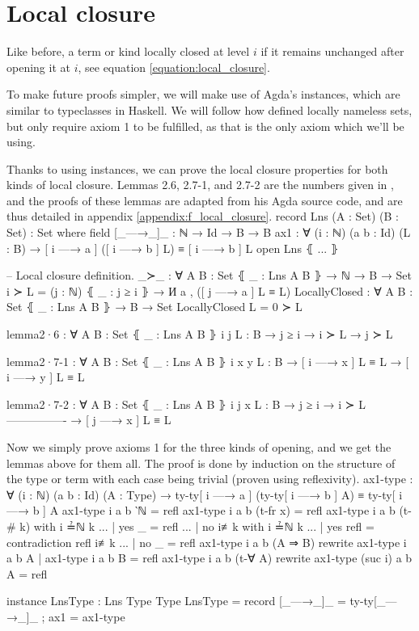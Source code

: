 \documentclass[logo,bsc,singlespacing,parskip,online]{infthesis}
\renewenvironment{code}{\mintedcopy[breaklines,breaksymbolleft=\;]{agda}}{\endmintedcopy}
\begin{document}
\section{Local closure}
\label{chapter4:local_closure}
Like before, a term or kind locally closed at level $i$ if it remains unchanged after opening it at
$i$, see equation \ref{equation:local_closure}.

To make future proofs simpler, we will make use of Agda's instances, which are similar to
typeclasses in Haskell. We will follow how \citet{pitts_locally_2023} defined locally nameless sets,
but only require axiom 1 to be fulfilled, as that is the only axiom which we'll be using.

Thanks to using instances, we can prove the local closure properties for both kinds of local
closure. Lemmas 2.6, 2.7-1, and 2.7-2 are the numbers given in \citet{pitts_locally_2023}, and the
proofs of these lemmas are adapted from his Agda source code, and are thus detailed in appendix \ref{appendix:f_local_closure}.
\begin{code}
  record Lns (A : Set) (B : Set) : Set where
    field
      [_—→_]_ : ℕ → Id → B → B
      ax1 : ∀ (i : ℕ) (a b : Id) (L : B)
        → [ i —→ a ] ([ i —→ b ] L) ≡ [ i —→ b ] L
  open Lns ⦃ ... ⦄

  -- Local closure definition.
  _≻_ : ∀ {A B : Set} ⦃ _ : Lns A B ⦄ → ℕ → B → Set
  i ≻ L = (j : ℕ) ⦃ _ : j ≥ i ⦄ → И a , ([ j —→ a ] L ≡ L)
  LocallyClosed : ∀ {A B : Set} ⦃ _ : Lns A B ⦄ → B → Set
  LocallyClosed L = 0 ≻ L

  lemma2·6 : ∀ {A B : Set} ⦃ _ : Lns A B ⦄ {i j} {L : B}
    → j ≥ i → i ≻ L → j ≻ L

  lemma2·7-1 : ∀ {A B : Set} ⦃ _ : Lns A B ⦄ {i x y} {L : B}
    → [ i —→ x ] L ≡ L → [ i —→ y ] L ≡ L

  lemma2·7-2 : ∀ {A B : Set} ⦃ _ : Lns A B ⦄ {i j x} {L : B}
    → j ≥ i    → i ≻ L
      ----------------
    → [ j —→ x ] L ≡ L
\end{code}

Now we simply prove axioms 1 for the three kinds of opening, and we get the lemmas above for them
all. The proof is done by induction on the structure of the type or term with each case being
trivial (proven using reflexivity).
\begin{code}
  ax1-type : ∀ (i : ℕ) (a b : Id) (A : Type)
    → ty-ty[ i —→ a ] (ty-ty[ i —→ b ] A) ≡ ty-ty[ i —→ b ] A
  ax1-type i a b ‵ℕ = refl
  ax1-type i a b (t-fr x) = refl
  ax1-type i a b (t-# k) with i ≟ℕ k
  ... | yes _   = refl
  ... | no  i≢k with i ≟ℕ k
  ...   | yes refl = contradiction refl i≢k
  ...   | no  _    = refl
  ax1-type i a b (A ⇒ B)
    rewrite ax1-type i a b A | ax1-type i a b B = refl
  ax1-type i a b (t-∀ A) rewrite ax1-type (suc i) a b A = refl

  instance
    LnsType : Lns Type Type
    LnsType = record
      { [_—→_]_ = ty-ty[_—→_]_
      ; ax1 = ax1-type }
\end{code}
\end{document}
